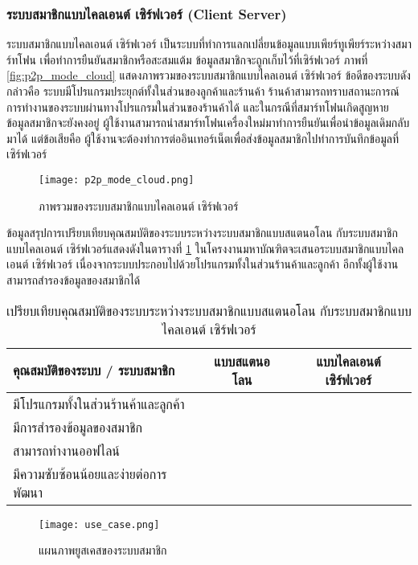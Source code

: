 \documentclass[a4paper]{article}
\newcommand{\cmark}{\ding{51}}
\newcommand{\xmark}{\ding{55}}
\begin{document}
\subsubsection{ระบบสมาชิกแบบไคลเอนต์ เซิร์ฟเวอร์ (Client Server)}
ระบบสมาชิกแบบไคลเอนต์ เซิร์ฟเวอร์ เป็นระบบที่ทำการแลกเปลี่ยนข้อมูลแบบเพียร์ทูเพียร์ระหว่างสมาร์ทโฟน เพื่อทำการยืนยันสมาชิกหรือสะสมแต้ม ข้อมูลสมาชิกจะถูกเก็บไว้ที่เซิร์ฟเวอร์ ภาพที่ \ref{fig:p2p_mode_cloud} แสดงภาพรวมของระบบสมาชิกแบบไคลเอนต์ เซิร์ฟเวอร์ ข้อดีของระบบดังกล่าวคือ ระบบมีโปรแกรมประยุกต์ทั้งในส่วนของลูกค้าและร้านค้า ร้านค้าสามารถทราบสถานะการณ์การทำงานของระบบผ่านทางโปรแกรมในส่วนของร้านค้าได้ และในกรณีที่สมาร์ทโฟนเกิดสูญหาย ข้อมูลสมาชิกจะยังคงอยู่ ผู้ใช้งานสามารถนำสมาร์ทโฟนเครื่องใหม่มาทำการยืนยันเพื่อนำข้อมูลเดิมกลับมาได้ แต่ข้อเสียคือ ผู้ใช้งานจะต้องทำการต่ออินเทอร์เน็ตเพื่อส่งข้อมูลสมาชิกไปทำการบันทึกข้อมูลที่เซิร์ฟเวอร์

\begin{figure}[ht!]
\centering
\texttt{[image: p2p\_mode\_cloud.png]}
\caption{ภาพรวมของระบบสมาชิกแบบไคลเอนต์ เซิร์ฟเวอร์} \label{fig:p2p_mode_cloud}
\label{overflow}
\end{figure}

ข้อมูลสรุปการเปรียบเทียบคุณสมบัติของระบบระหว่างระบบสมาชิกแบบสแตนอโลน กับระบบสมาชิกแบบไคลเอนต์ เซิร์ฟเวอร์แสดงดังในตารางที่ \ref{tab:compare_feature} ในโครงงานมหาบัณฑิตจะเสนอระบบสมาชิกแบบไคลเอนต์ เซิร์ฟเวอร์ เนื่องจากระบบประกอบไปด้วยโปรแกรมทั้งในส่วนร้านค้าและลูกค้า อีกทั้งผู้ใช้งานสามารถสำรองข้อมูลของสมาชิกได้ 

\begin{table}[ht!]
\centering
\begin{tabular}{ | l | c | c | }
	\hline                        
  	คุณสมบัติของระบบ / ระบบสมาชิก 		& แบบสแตนอโลน & แบบไคลเอนต์ เซิร์ฟเวอร์ \\
  	\hline 
  	มีโปรแกรมทั้งในส่วนร้านค้าและลูกค้า 		& \xmark & \cmark \\
  	\hline
  	มีการสำรองข้อมูลของสมาชิก				& \xmark & \cmark \\
  	\hline
  	สามารถทำงานออฟไลน์ 					& \cmark & \xmark \\
  	\hline
  	มีความซับซ้อนน้อยและง่ายต่อการพัฒนา		& \cmark & \xmark \\
  	\hline  
\end{tabular}
\caption{เปรียบเทียบคุณสมบัติของระบบระหว่างระบบสมาชิกแบบสแตนอโลน กับระบบสมาชิกแบบไคลเอนต์ เซิร์ฟเวอร์}
\label{tab:compare_feature}
\end{table}


\begin{figure}[ht!]
\centering
\texttt{[image: use\_case.png]}
\caption{แผนภาพยูสเคสของระบบสมาชิก} \label{fig:p2p_mode_cloud}
\label{overflow}
\end{figure}
\end{document}
